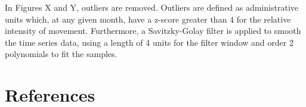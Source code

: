 \documentclass[
  11pt,
]{article}
\begin{document}
In Figures X and Y, outliers are removed. Outliers are defined as
administrative units which, at any given month, have a z-score greater
than 4 for the relative intensity of movement. Furthermore, a
Savitzky-Golay filter is applied to smooth the time series data, using a
length of 4 units for the filter window and order 2 polynomials to fit
the samples.

\hypertarget{references}{%
\section{References}\label{references}}
\end{document}
